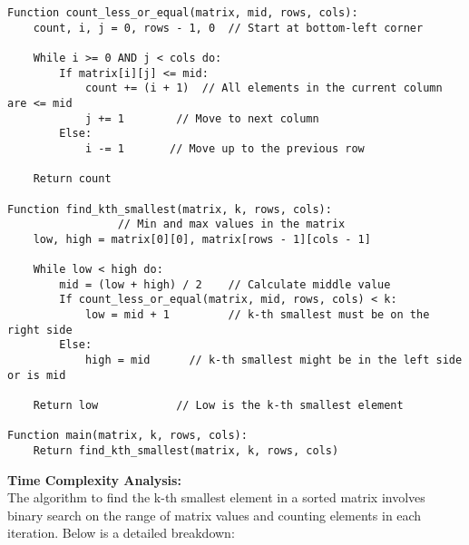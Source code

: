 \documentclass[a4paper,12pt]{report}
\begin{document}
\begin{tcolorbox}[colback=white, colframe=black, boxrule=0.5pt]
\ttfamily\small
\begin{verbatim}
Function count_less_or_equal(matrix, mid, rows, cols):
    count, i, j = 0, rows - 1, 0  // Start at bottom-left corner
    
    While i >= 0 AND j < cols do:
        If matrix[i][j] <= mid:
            count += (i + 1)  // All elements in the current column are <= mid
            j += 1        // Move to next column
        Else:
            i -= 1       // Move up to the previous row
    
    Return count

Function find_kth_smallest(matrix, k, rows, cols):
				 // Min and max values in the matrix
    low, high = matrix[0][0], matrix[rows - 1][cols - 1] 
    
    While low < high do:
        mid = (low + high) / 2    // Calculate middle value
        If count_less_or_equal(matrix, mid, rows, cols) < k:
            low = mid + 1         // k-th smallest must be on the right side
        Else:
            high = mid      // k-th smallest might be in the left side or is mid
    
    Return low            // Low is the k-th smallest element

Function main(matrix, k, rows, cols):
    Return find_kth_smallest(matrix, k, rows, cols)
\end{verbatim}
\end{tcolorbox}

\large \textbf{Time Complexity Analysis:} \hfill \\

The algorithm to find the k-th smallest element in a sorted matrix involves binary search on the range of matrix values and counting elements in each iteration. Below is a detailed breakdown:
\end{document}
